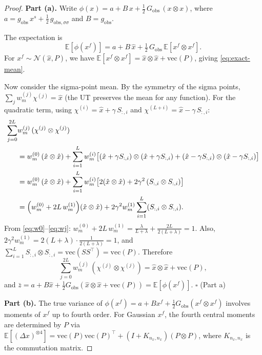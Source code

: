 \documentclass[12pt,a4paper]{article}
\newcommand{\E}{\mathbb{E}}
\newcommand{\vect}{\mathrm{vec}}
\newcommand{\kron}{\otimes}
\newcommand{\xf}{{x^{f}}}
\newcommand{\xs}{{x^{s}}}
\begin{document}
\begin{proof}
\textbf{Part (a).}
Write $\phi(x) = a + B\,x + \tfrac{1}{2}\,G_{\mathrm{obs}}\,(x \kron x)$,
where $a = g_{\mathrm{obs}}\,\xs + \tfrac{1}{2}\,g_{\mathrm{obs},\sigma\sigma}$
and $B = g_{\mathrm{obs}}$.

The expectation is
\begin{equation}
\E[\phi(\xf)] = a + B\,\hat{x}
  + \tfrac{1}{2}\,G_{\mathrm{obs}}\,
    \E[\xf \kron \xf].
\end{equation}
For $\xf \sim \mathcal{N}(\hat{x}, P)$, we have
$\E[\xf \kron \xf] = \hat{x} \kron \hat{x} + \vect(P)$, giving
\eqref{eq:exact-mean}.

Now consider the sigma-point mean. By the symmetry of the sigma
points, $\sum_j w_m^{(j)} \chi^{(j)} = \hat{x}$ (the UT preserves
the mean for any function). For the quadratic term, using
$\chi^{(i)} = \hat{x} + \gamma\,S_{:,i}$ and
$\chi^{(L+i)} = \hat{x} - \gamma\,S_{:,i}$:
\begin{align}
\sum_{j=0}^{2L} &w_m^{(j)}\,(\chi^{(j)} \kron \chi^{(j)})
\notag\\
&= w_m^{(0)}\,(\hat{x} \kron \hat{x})
+ \sum_{i=1}^{L} w_m^{(i)}\bigl[
  (\hat{x} + \gamma S_{:,i}) \kron (\hat{x} + \gamma S_{:,i})
  + (\hat{x} - \gamma S_{:,i}) \kron (\hat{x} - \gamma S_{:,i})
\bigr] \notag\\
&= w_m^{(0)}\,(\hat{x} \kron \hat{x})
+ \sum_{i=1}^{L} w_m^{(i)}\bigl[
  2(\hat{x} \kron \hat{x})
  + 2\gamma^2\,(S_{:,i} \kron S_{:,i})
\bigr] \notag\\
&= \Bigl(w_m^{(0)} + 2L\,w_m^{(1)}\Bigr)(\hat{x} \kron \hat{x})
+ 2\gamma^2 w_m^{(1)} \sum_{i=1}^{L} (S_{:,i} \kron S_{:,i}).
\label{eq:kron-sigma}
\end{align}
From \eqref{eq:w0}--\eqref{eq:wj}:
$w_m^{(0)} + 2L\,w_m^{(1)}
= \frac{\lambda}{L+\lambda} + \frac{2L}{2(L+\lambda)} = 1$.
Also, $2\gamma^2 w_m^{(1)}
= 2(L+\lambda) \cdot \frac{1}{2(L+\lambda)} = 1$,
and $\sum_{i=1}^{L} S_{:,i} \kron S_{:,i} = \vect(SS^\top) = \vect(P)$.
Therefore
\begin{equation}
\sum_{j=0}^{2L} w_m^{(j)}\,(\chi^{(j)} \kron \chi^{(j)})
= \hat{x} \kron \hat{x} + \vect(P),
\end{equation}
and $\bar{z} = a + B\hat{x}
+ \tfrac{1}{2}G_{\mathrm{obs}}(\hat{x} \kron \hat{x} + \vect(P))
= \E[\phi(\xf)]$. \hfill$\square$ (Part a)

\medskip
\textbf{Part (b).}
The true variance of $\phi(\xf) = a + B\xf + \tfrac{1}{2}G_{\mathrm{obs}}(\xf \kron \xf)$
involves moments of $\xf$ up to fourth order. For Gaussian $\xf$,
the fourth central moments are determined by $P$ via
$\E[(\Delta x)^{\kron 4}]
= \vect(P) \vect(P)^\top + (I + K_{n_x,n_x})(P \kron P)$,
where $K_{n_x,n_x}$ is the commutation matrix.


\end{proof}
\end{document}
